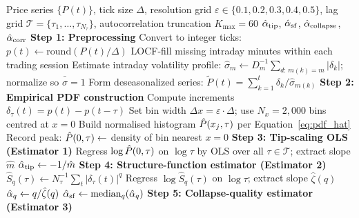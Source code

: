 \documentclass[12pt,a4paper]{article}
\begin{document}
\begin{table}[htbp]
\FloatBarrier



\clearpage
\onecolumn
\begin{center}
\begin{minipage}{0.82\linewidth}
\begin{algorithm}[H]
\caption{L\'{e}vy Scaling Exponent Estimation}
\label{alg:pipeline}
\begin{algorithmic}[1]
\Require Price series $\{P(t)\}$, tick size $\Delta$,
         resolution grid $\varepsilon\!\in\!\{0.1,0.2,0.3,0.4,0.5\}$,
         lag grid $\mathcal{T}=\{\tau_1,\ldots,\tau_{N_\tau}\}$,
         autocorrelation truncation $K_{\max}=60$
\Ensure $\hat{\alpha}_{\mathrm{tip}}$,\;
        $\hat{\alpha}_{\mathrm{sf}}$,\;
        $\hat{\alpha}_{\mathrm{collapse}}$,\;
        $\hat{\alpha}_{\mathrm{corr}}$
\Statex
\State \textbf{Step 1: Preprocessing}
\State Convert to integer ticks:\; $p(t)\leftarrow\mathrm{round}(P(t)/\Delta)$
\State LOCF-fill missing intraday minutes within each trading session
\State Estimate intraday volatility profile: $\hat{\sigma}_m\leftarrow D_m^{-1}\sum_{d:\,m(k)=m}|\delta_k|$;\; normalize so $\bar{\hat\sigma}=1$
\State Form deseasonalized series: $\tilde{P}(t)=\textstyle\sum_{k=1}^{t}\delta_k/\hat\sigma_{m(k)}$
\Statex
\State \textbf{Step 2: Empirical PDF construction}
  \State Compute increments $\delta_\tau(t)=p(t)-p(t-\tau)$
  \State Set bin width $\Delta x=\varepsilon\cdot\Delta$;\; use $N_x=2{,}000$ bins centred at $x=0$
  \State Build normalised histogram $\hat{P}(x_j,\tau)$ per Equation~\eqref{eq:pdf_hat}
  \State Record peak: $\hat{P}(0,\tau)\leftarrow$ density of bin nearest $x=0$
\EndFor
\Statex
\State \textbf{Step 3: Tip-scaling OLS (Estimator 1)}
\State Regress $\log\hat{P}(0,\tau)$ on $\log\tau$ by OLS over all $\tau\in\mathcal{T}$;\; extract slope $\hat{m}$
\State $\hat{\alpha}_{\mathrm{tip}}\leftarrow -1/\hat{m}$
\Statex
\State \textbf{Step 4: Structure-function estimator (Estimator 2)}
  \State $\hat{S}_q(\tau)\leftarrow N_\tau^{-1}\sum_t|\delta_\tau(t)|^q$
  \State Regress $\log\hat{S}_q(\tau)$ on $\log\tau$;\; extract slope $\hat\zeta(q)$
  \State $\hat{\alpha}_q\leftarrow q/\hat\zeta(q)$
\EndFor
\State $\hat{\alpha}_{\mathrm{sf}}\leftarrow\mathrm{median}_q\!\left(\hat{\alpha}_q\right)$
\Statex
\State \textbf{Step 5: Collapse-quality estimator (Estimator 3)}

\end{algorithmic}
\end{algorithm}
\end{minipage}
\end{center}
\end{table}
\end{document}
